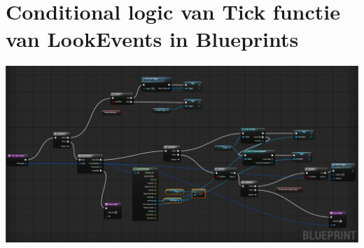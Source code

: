 \chapter{Conditional logic van Tick functie van LookEvents in Blueprints}
\lhead{}
\label{appendix:LookEventsLogicBlueprints}
\includegraphics[width=\linewidth,height=\textheight,keepaspectratio]{Figures/WasHitBytTraceBluePrintExample.png}